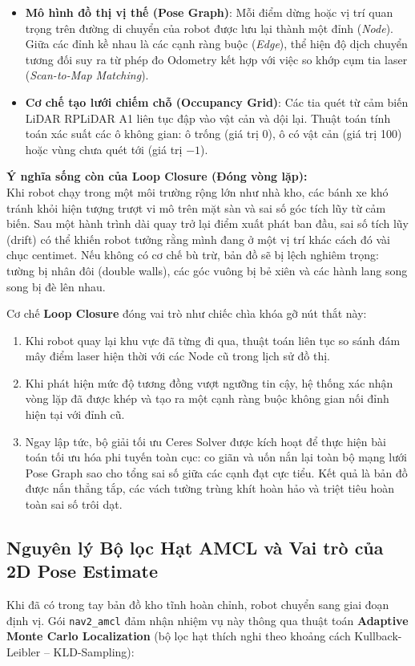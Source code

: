 \documentclass[12pt, a4paper]{article}
\begin{document}
\begin{itemize}
    \item \textbf{Mô hình đồ thị vị thế (Pose Graph)}: Mỗi điểm dừng hoặc vị trí quan trọng trên đường di chuyển của robot được lưu lại thành một đỉnh (\textit{Node}). Giữa các đỉnh kề nhau là các cạnh ràng buộc (\textit{Edge}), thể hiện độ dịch chuyển tương đối suy ra từ phép đo Odometry kết hợp với việc so khớp cụm tia laser (\textit{Scan-to-Map Matching}).
    \item \textbf{Cơ chế tạo lưới chiếm chỗ (Occupancy Grid)}: Các tia quét từ cảm biến LiDAR RPLiDAR A1 liên tục đập vào vật cản và dội lại. Thuật toán tính toán xác suất các ô không gian: ô trống (giá trị 0), ô có vật cản (giá trị 100) hoặc vùng chưa quét tới (giá trị $-1$).
\end{itemize}

\textbf{Ý nghĩa sống còn của Loop Closure (Đóng vòng lặp):}\\
Khi robot chạy trong một môi trường rộng lớn như nhà kho, các bánh xe khó tránh khỏi hiện tượng trượt vi mô trên mặt sàn và sai số góc tích lũy từ cảm biến. Sau một hành trình dài quay trở lại điểm xuất phát ban đầu, sai số tích lũy (drift) có thể khiến robot tưởng rằng mình đang ở một vị trí khác cách đó vài chục centimet. Nếu không có cơ chế bù trừ, bản đồ sẽ bị lệch nghiêm trọng: tường bị nhân đôi (double walls), các góc vuông bị bẻ xiên và các hành lang song song bị đè lên nhau.

Cơ chế \textbf{Loop Closure} đóng vai trò như chiếc chìa khóa gỡ nút thắt này:
\begin{enumerate}
    \item Khi robot quay lại khu vực đã từng đi qua, thuật toán liên tục so sánh đám mây điểm laser hiện thời với các Node cũ trong lịch sử đồ thị.
    \item Khi phát hiện mức độ tương đồng vượt ngưỡng tin cậy, hệ thống xác nhận vòng lặp đã được khép và tạo ra một cạnh ràng buộc không gian nối đỉnh hiện tại với đỉnh cũ.
    \item Ngay lập tức, bộ giải tối ưu Ceres Solver được kích hoạt để thực hiện bài toán tối ưu hóa phi tuyến toàn cục: co giãn và uốn nắn lại toàn bộ mạng lưới Pose Graph sao cho tổng sai số giữa các cạnh đạt cực tiểu. Kết quả là bản đồ được nắn thẳng tắp, các vách tường trùng khít hoàn hảo và triệt tiêu hoàn toàn sai số trôi dạt.
\end{enumerate}

\subsection{Nguyên lý Bộ lọc Hạt AMCL và Vai trò của 2D Pose Estimate}
Khi đã có trong tay bản đồ kho tĩnh hoàn chỉnh, robot chuyển sang giai đoạn định vị. Gói \texttt{nav2\_amcl} đảm nhận nhiệm vụ này thông qua thuật toán \textbf{Adaptive Monte Carlo Localization} (bộ lọc hạt thích nghi theo khoảng cách Kullback-Leibler -- KLD-Sampling):
\end{document}
